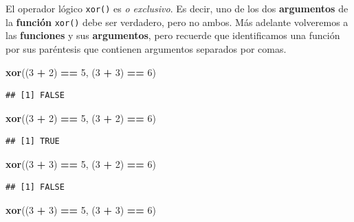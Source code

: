 \documentclass[
]{book}
\newenvironment{Shaded}{\begin{snugshade}}{\end{snugshade}}
\newcommand{\DecValTok}[1]{\textcolor[rgb]{0.00,0.00,0.81}{#1}}
\newcommand{\KeywordTok}[1]{\textcolor[rgb]{0.13,0.29,0.53}{\textbf{#1}}}
\newcommand{\NormalTok}[1]{#1}
\newcommand{\OperatorTok}[1]{\textcolor[rgb]{0.81,0.36,0.00}{\textbf{#1}}}
\newcommand{\StringTok}[1]{\textcolor[rgb]{0.31,0.60,0.02}{#1}}
\begin{document}
El operador lógico \texttt{xor()} es \emph{o exclusivo}. Es decir, uno de los dos \textbf{argumentos} de la \textbf{función} \texttt{xor()} debe ser verdadero, pero no ambos. Más adelante volveremos a las \textbf{funciones} y sus \textbf{argumentos}, pero recuerde que identificamos una función por sus paréntesis que contienen argumentos separados por comas.

\begin{Shaded}
\begin{Highlighting}[]
\KeywordTok{xor}\NormalTok{((}\DecValTok{3} \OperatorTok{+}\StringTok{ }\DecValTok{2}\NormalTok{) }\OperatorTok{==}\StringTok{ }\DecValTok{5}\NormalTok{, (}\DecValTok{3} \OperatorTok{+}\StringTok{ }\DecValTok{3}\NormalTok{) }\OperatorTok{==}\StringTok{ }\DecValTok{6}\NormalTok{)}
\end{Highlighting}
\end{Shaded}

\begin{verbatim}
## [1] FALSE
\end{verbatim}

\begin{Shaded}
\begin{Highlighting}[]
\KeywordTok{xor}\NormalTok{((}\DecValTok{3} \OperatorTok{+}\StringTok{ }\DecValTok{2}\NormalTok{) }\OperatorTok{==}\StringTok{ }\DecValTok{5}\NormalTok{, (}\DecValTok{3} \OperatorTok{+}\StringTok{ }\DecValTok{2}\NormalTok{) }\OperatorTok{==}\StringTok{ }\DecValTok{6}\NormalTok{)}
\end{Highlighting}
\end{Shaded}

\begin{verbatim}
## [1] TRUE
\end{verbatim}

\begin{Shaded}
\begin{Highlighting}[]
\KeywordTok{xor}\NormalTok{((}\DecValTok{3} \OperatorTok{+}\StringTok{ }\DecValTok{3}\NormalTok{) }\OperatorTok{==}\StringTok{ }\DecValTok{5}\NormalTok{, (}\DecValTok{3} \OperatorTok{+}\StringTok{ }\DecValTok{2}\NormalTok{) }\OperatorTok{==}\StringTok{ }\DecValTok{6}\NormalTok{)}
\end{Highlighting}
\end{Shaded}

\begin{verbatim}
## [1] FALSE
\end{verbatim}

\begin{Shaded}
\begin{Highlighting}[]
\KeywordTok{xor}\NormalTok{((}\DecValTok{3} \OperatorTok{+}\StringTok{ }\DecValTok{3}\NormalTok{) }\OperatorTok{==}\StringTok{ }\DecValTok{5}\NormalTok{, (}\DecValTok{3} \OperatorTok{+}\StringTok{ }\DecValTok{3}\NormalTok{) }\OperatorTok{==}\StringTok{ }\DecValTok{6}\NormalTok{)}
\end{Highlighting}
\end{Shaded}
\end{document}

